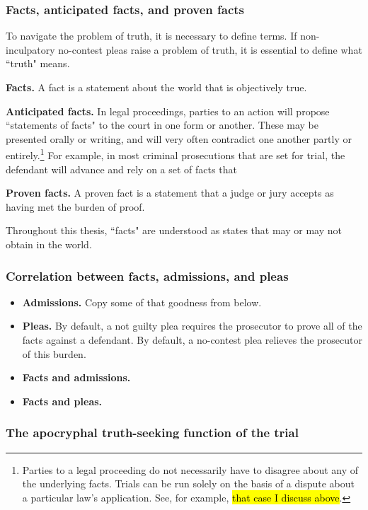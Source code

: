 \subsubsection{Facts, anticipated facts, and proven facts}

To navigate the problem of truth, it is necessary to define terms. If non-inculpatory no-contest pleas raise a problem of truth, it is essential to define what ``truth" means. 

\textbf{Facts.} A fact is a statement about the world that is objectively true. 

\textbf{Anticipated facts.} In legal proceedings, parties to an action will propose ``statements of facts" to the court in one form or another. These may be presented orally or writing, and will very often contradict one another partly or entirely.\footnote{Parties to a legal proceeding do not necessarily have to disagree about any of the underlying facts. Trials can be run solely on the basis of a dispute about a particular law's application. See, for example, \hl{that case I discuss above}.} For example, in most criminal prosecutions that are set for trial, the defendant will advance and rely on a set of facts that 

\textbf{Proven facts.} A proven fact is a statement that a judge or jury accepts as having met the burden of proof. 

Throughout this thesis, ``facts" are understood as states that may or may not obtain in the world. 

\subsubsection{Correlation between facts, admissions, and pleas}

\begin{itemize}
    \item \textbf{Admissions.} Copy some of that goodness from below.
    \item \textbf{Pleas.} By default, a not guilty plea requires the prosecutor to prove all of the facts against a defendant. By default, a no-contest plea relieves the prosecutor of this burden.
    \item \textbf{Facts and admissions.} 
    \item \textbf{Facts and pleas.}
\end{itemize}

\subsubsection{The apocryphal truth-seeking function of the trial}

